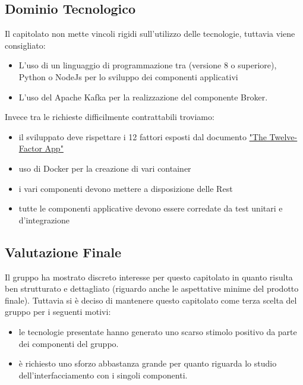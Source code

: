 \subsection{Dominio Tecnologico}
Il capitolato non mette vincoli rigidi sull'utilizzo delle tecnologie, tuttavia viene consigliato:
\begin{itemize}
 \item L'uso di un linguaggio di programmazione tra  (versione 8 o superiore), Python o NodeJs per lo sviluppo dei componenti applicativi
 \item L'uso del  Apache Kafka per la realizzazione del componente Broker.
\end{itemize}
Invece tra le richieste difficilmente contrattabili troviamo:
\begin{itemize} 
 \item il  sviluppato deve rispettare i 12 fattori esposti dal documento \href{https://en.wikipedia.org/wiki/Twelve-Factor_App_methodology}{"The Twelve-Factor App"}
 \item uso di Docker per la creazione di vari container
 \item i vari componenti devono mettere a disposizione delle  Rest
 \item tutte le componenti applicative devono essere corredate da test unitari e d'integrazione
\end{itemize}

\subsection{Valutazione Finale}
 Il gruppo ha mostrato discreto interesse per questo capitolato in quanto risulta ben strutturato e dettagliato (riguardo anche le aspettative minime del prodotto  finale).
 Tuttavia si è deciso di mantenere questo capitolato come terza scelta del gruppo per i seguenti motivi:
\begin{itemize}
  \item le tecnologie presentate hanno generato uno scarso stimolo positivo da parte dei componenti del gruppo.
  \item è richiesto uno sforzo abbastanza grande per quanto riguarda lo studio dell'interfacciamento con i singoli componenti.
\end{itemize}
